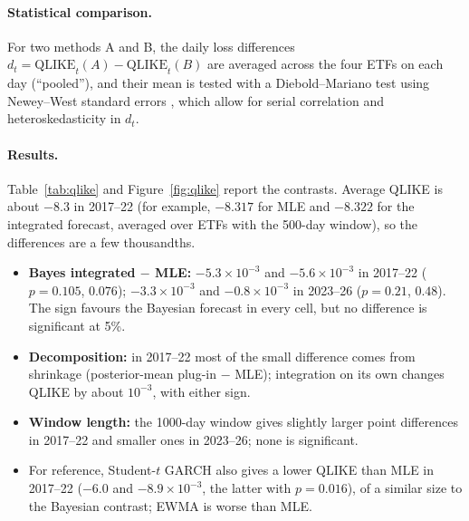 \documentclass[11pt]{article}
\begin{document}
\paragraph{Statistical comparison.} For two methods A and B, the daily loss differences
$d_t=\text{QLIKE}_t(A)-\text{QLIKE}_t(B)$ are averaged across the four ETFs on each day (``pooled''), and their mean is
tested with a Diebold--Mariano test \cite{diebold1995} using Newey--West standard errors \cite{neweywest1987}, which
allow for serial correlation and heteroskedasticity in $d_t$.

\paragraph{Results.} Table~\ref{tab:qlike} and Figure~\ref{fig:qlike} report the contrasts. Average QLIKE is about
$-8.3$ in 2017--22 (for example, $-8.317$ for MLE and $-8.322$ for the integrated forecast, averaged over ETFs with the
500-day window), so the differences are a few thousandths.
\begin{itemize}
\item \textbf{Bayes integrated $-$ MLE:} $-5.3\times10^{-3}$ and $-5.6\times10^{-3}$ in 2017--22 ($p=0.105$, $0.076$);
$-3.3\times10^{-3}$ and $-0.8\times10^{-3}$ in 2023--26 ($p=0.21$, $0.48$). The sign favours the Bayesian forecast in
every cell, but no difference is significant at 5\%.
\item \textbf{Decomposition:} in 2017--22 most of the small difference comes from shrinkage (posterior-mean plug-in $-$ MLE);
integration on its own changes QLIKE by about $10^{-3}$, with either sign.
\item \textbf{Window length:} the 1000-day window gives slightly larger point differences in 2017--22 and smaller ones
in 2023--26; none is significant.
\item For reference, Student-$t$ GARCH also gives a lower QLIKE than MLE in 2017--22 ($-6.0$ and $-8.9\times10^{-3}$,
the latter with $p=0.016$), of a similar size to the Bayesian contrast; EWMA is worse than MLE.
\end{itemize}

\begin{table}[h]\centering\footnotesize
\resizebox{\textwidth}{!}{}
\caption{H1. Pooled four-ETF Diebold--Mariano contrasts of QLIKE. Entries are mean daily differences $\times10^{-3}$
(negative favours the first method) with Newey--West $p$-values.}\label{tab:qlike}
\end{table}
\end{document}
